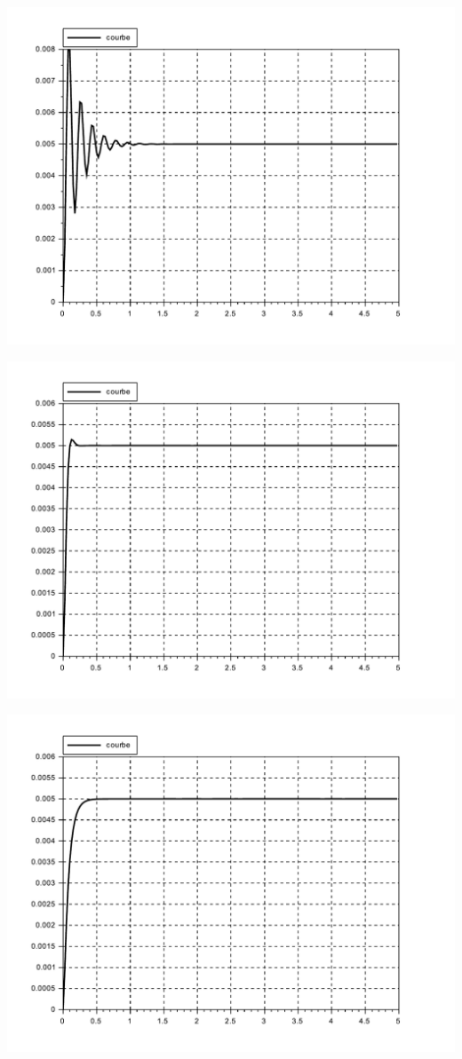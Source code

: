 \begin{minipage}{0.3\linewidth}
 \includegraphics[width=0.8\linewidth]{img/Inf}
\end{minipage}\hfill
\begin{minipage}{0.3\linewidth}
 \includegraphics[width=0.8\linewidth]{img/Int}
\end{minipage}\hfill
\begin{minipage}{0.3\linewidth}
 \includegraphics[width=0.8\linewidth]{img/Sup}
\end{minipage}\hfill


